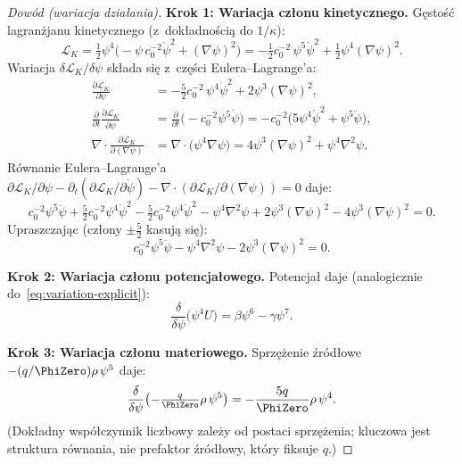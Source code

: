 \begin{proof}[Dow\'od (wariacja dzia\l{}ania)]
\medskip\noindent\textbf{Krok 1: Wariacja cz\l{}onu kinetycznego.}
G\k{e}sto\'s\'c lagran\.zjanu kinetycznego (z~dok\l{}adno\'sci\k{a}
do $1/\kappa$):
\[
  \mathcal{L}_K = \tfrac{1}{2}\psi^4
  \bigl(-\psi\,c_0^{-2}\dot\psi^2 + (\nabla\psi)^2\bigr)
  = -\tfrac{1}{2}c_0^{-2}\,\psi^5\dot\psi^2
    + \tfrac{1}{2}\psi^4(\nabla\psi)^2.
\]
Wariacja $\delta\mathcal{L}_K / \delta\psi$ sk\l{}ada si\k{e}
z~cz\k{e}\'sci Eulera--Lagrange'a:
\begin{align}
  \frac{\partial\mathcal{L}_K}{\partial\psi}
  &= -\tfrac{5}{2}c_0^{-2}\,\psi^4\dot\psi^2
     + 2\psi^3(\nabla\psi)^2,
  \label{eq:var-direct}\\[4pt]
  \frac{\partial}{\partial t}
    \frac{\partial\mathcal{L}_K}{\partial\dot\psi}
  &= \frac{\partial}{\partial t}\bigl(-c_0^{-2}\psi^5\dot\psi\bigr)
  = -c_0^{-2}\bigl(5\psi^4\dot\psi^2 + \psi^5\ddot\psi\bigr),
  \label{eq:var-time}\\[4pt]
  \nabla\!\cdot\!\frac{\partial\mathcal{L}_K}{\partial(\nabla\psi)}
  &= \nabla\!\cdot\!\bigl(\psi^4\nabla\psi\bigr)
  = 4\psi^3(\nabla\psi)^2 + \psi^4\nabla^2\psi.
  \label{eq:var-space}
\end{align}
R\'ownanie Eulera--Lagrange'a
$\partial\mathcal{L}_K/\partial\psi
 - \partial_t(\partial\mathcal{L}_K/\partial\dot\psi)
 - \nabla\!\cdot\!(\partial\mathcal{L}_K/\partial(\nabla\psi))
= 0$
daje:
\begin{equation}\label{eq:EL-kinetic}
  c_0^{-2}\psi^5\ddot\psi
  + \tfrac{5}{2}c_0^{-2}\psi^4\dot\psi^2
  - \tfrac{5}{2}c_0^{-2}\psi^4\dot\psi^2
  - \psi^4\nabla^2\psi
  + 2\psi^3(\nabla\psi)^2
  - 4\psi^3(\nabla\psi)^2 = 0.
\end{equation}
Upraszczaj\k{a}c (cz\l{}ony $\pm\tfrac{5}{2}$ kasuj\k{a} si\k{e}):
\[
  c_0^{-2}\psi^5\ddot\psi
  - \psi^4\nabla^2\psi
  - 2\psi^3(\nabla\psi)^2 = 0.
\]

\medskip\noindent\textbf{Krok 2: Wariacja cz\l{}onu potencja\l{}owego.}
Potencja\l{} daje (analogicznie do~\eqref{eq:variation-explicit}):
\[
  \frac{\delta}{\delta\psi}\bigl(\psi^4 U\bigr)
  = \beta\psi^6 - \gamma\psi^7.
\]

\medskip\noindent\textbf{Krok 3: Wariacja cz\l{}onu materio\-wego.}
Sprz\k{e}\.zenie \'zr\'od\l{}owe $-(q/\PhiZero)\rho\,\psi^5$ daje:
\[
  \frac{\delta}{\delta\psi}\bigl(-\tfrac{q}{\PhiZero}\rho\,\psi^5\bigr)
  = -\frac{5q}{\PhiZero}\rho\,\psi^4.
\]
(Dok\l{}adny wsp\'o\l{}czynnik liczbowy zale\.zy od postaci
sprz\k{e}\.zenia; kluczowa jest struktura r\'ownania, nie
prefaktor \'zr\'od\l{}owy, kt\'ory fiksuje $q$.)


\end{proof}
